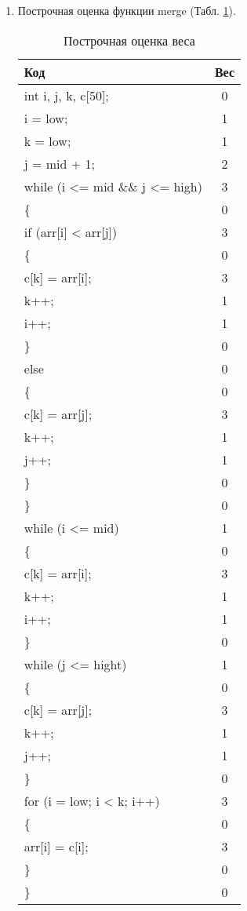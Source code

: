 \begin{enumerate}

\item Построчная оценка функции merge (Табл. \ref{tab:table3}).

	\begin{longtable}{|l c|} 
				\caption{Построчная оценка веса}
		\label{tab:table3}\\
		\hline
		Код & Вес \\ [0.5ex] 
		\hline\hline
		int i, j, k, c[50]; & 0\\
		\hline
		 i = low; & 1\\
		\hline
		 k = low; & 1\\
		\hline
		j = mid + 1; & 2\\
		\hline
		while (i <= mid \&\& j <= high)  & 3\\
		\hline
		\{ & 0\\
		\hline
		if (arr[i] < arr[j])  & 3\\
		\hline
		\{ & 0\\
		\hline
	    c[k] = arr[i]; & 3\\
		\hline
		k++; & 1\\
		\hline
		i++; & 1\\
		\hline
		\} & 0\\
		\hline
		else & 0 \\
		\hline
		\{ & 0\\
		\hline
		c[k] = arr[j]; & 3\\
		\hline
		k++; & 1\\
		\hline
		j++; & 1\\
		\hline
		\} & 0\\
		\hline
		\} & 0\\
		\hline
		while (i <= mid) & 1\\
		\hline
		\{ & 0\\
		\hline
		c[k] = arr[i]; & 3\\
		\hline
		k++; & 1\\
		\hline
		i++; & 1\\
		\hline
		\} & 0\\
		\hline
		while (j <= hight) & 1\\
		\hline
		\{ & 0\\
		\hline
		c[k] = arr[j]; & 3\\
		\hline
		k++; & 1\\
		\hline
		j++; & 1\\
		\hline
		\} & 0\\
		\hline
		for (i = low; i < k; i++) & 3\\
		\hline
		\{ & 0\\
		\hline
		arr[i] = c[i]; & 3\\
		\hline
		\} & 0\\
		\hline
		\hline
		\} & 0\\
		\hline


\end{longtable}
\end{enumerate}
